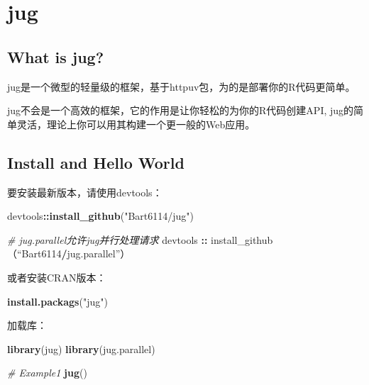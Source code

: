 \documentclass[]{book}
\newenvironment{Shaded}{\begin{snugshade}}{\end{snugshade}}
\newcommand{\KeywordTok}[1]{\textcolor[rgb]{0.13,0.29,0.53}{\textbf{#1}}}
\newcommand{\StringTok}[1]{\textcolor[rgb]{0.31,0.60,0.02}{#1}}
\newcommand{\CommentTok}[1]{\textcolor[rgb]{0.56,0.35,0.01}{\textit{#1}}}
\newcommand{\OperatorTok}[1]{\textcolor[rgb]{0.81,0.36,0.00}{\textbf{#1}}}
\newcommand{\NormalTok}[1]{#1}
\begin{document}
\chapter{jug}\label{jug}

\section{What is jug?}\label{what-is-jug}

jug是一个微型的轻量级的框架，基于httpuv包，为的是部署你的R代码更简单。

jug不会是一个高效的框架，它的作用是让你轻松的为你的R代码创建API,
jug的简单灵活，理论上你可以用其构建一个更一般的Web应用。

\hypertarget{install-and-hello-world}{\section{Install and Hello
World}\label{install-and-hello-world}}

要安装最新版本，请使用devtools：

\begin{Shaded}
\begin{Highlighting}[]
\NormalTok{devtools}\OperatorTok{::}\KeywordTok{install_github}\NormalTok{(}\StringTok{"Bart6114/jug"}\NormalTok{)}

\CommentTok{# jug.parallel允许jug并行处理请求}
\NormalTok{devtools }\OperatorTok{::}\StringTok{ }\NormalTok{install_github（“Bart6114}\OperatorTok{/}\NormalTok{jug.parallel”）}
\end{Highlighting}
\end{Shaded}

或者安装CRAN版本：

\begin{Shaded}
\begin{Highlighting}[]
\KeywordTok{install.packags}\NormalTok{(}\StringTok{"jug"}\NormalTok{)}
\end{Highlighting}
\end{Shaded}

加载库：

\begin{Shaded}
\begin{Highlighting}[]
\KeywordTok{library}\NormalTok{(jug)}
\KeywordTok{library}\NormalTok{(jug.parallel)}
\end{Highlighting}
\end{Shaded}

\begin{Shaded}
\begin{Highlighting}[]
\CommentTok{# Example1}
\KeywordTok{jug}\NormalTok{()}
\end{Highlighting}
\end{Shaded}
\end{document}
